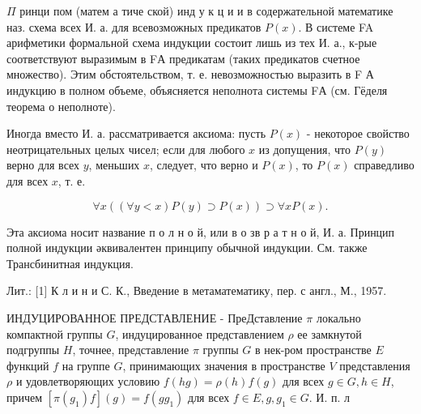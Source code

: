 \documentclass[10pt]{article}
\begin{document}
$\Pi$ ринци пом (матем а тиче ской) инд у к ц и и в содержательной математике наз. схема всех И. а. для всевозможных предикатов $P(x)$. В системе FA арифметики формальной схема индукции состоит лишь из тех И. а., к-рые соответствуют выразимым в FА предикатам (таких предикатов счетное множество). Этим обстоятельством, т. е. невозможностью выразить в F А индукцию в полном объеме, объясняется неполнота системы FА (см. Гёделя теорема о неполноте).



Иногда вместо И. а. рассматривается аксиома: пусть $P(x)$ - некоторое свойство неотрицательных целых чисел; если для любого $x$ из допущения, что $P(y)$ верно для всех $y$, меньших $x$, следует, что верно и $P(x)$, то $P(x)$ справедливо для всех $x$, т. е.



\[

\forall x((\forall y<x) P(y) \supset P(x)) \supset \forall x P(x) .

\]



Эта аксиома носит название п о л н о й, или в о зв р а т н о й, И. а. Принцип полной индукции әквивалентен принципу обычной индукции. См. также Трансбинитная индукция.



Лит.: [1] К л и н и С. К., Введение в метаматематику, пер. с англ., М., 1957.



ИНДУЦИРОВАННОЕ ПРЕДСТАВЛЕНИЕ - ПреДставление $\pi$ локально компактной группы $G$, индуцированное представлением $\rho$ ее замкнутой подгруппы $H$, точнее, представление $\pi$ группы $G$ в нек-ром пространстве $E$ функций $f$ на группе $G$, принимающих значения в пространстве $V$ представления $\rho$ и удовлетворяющих условию $f(h g)=\rho(h) f(g)$ для всех $g \in G, h \in H$, причем $\left[\pi\left(g_{1}\right) f\right](g)=f\left(g g_{1}\right)$ для всех $f \in E, g, g_{1} \in G$. И. п. л
\end{document}
